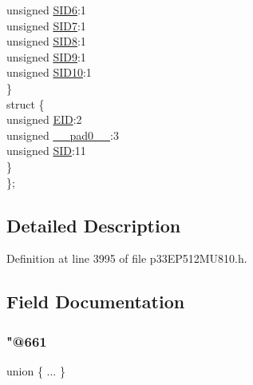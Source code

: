 \begin{DoxyCompactItemize}
\begin{tabbing}
\>\>unsigned \hyperlink{structtag_c1_r_x_f5_s_i_d_b_i_t_s_a70d70952133eb2389d5c326f9f0e8035}{SID6}:1\\
\>\>unsigned \hyperlink{structtag_c1_r_x_f5_s_i_d_b_i_t_s_a34097fb76decd431701fa2d86a22328e}{SID7}:1\\
\>\>unsigned \hyperlink{structtag_c1_r_x_f5_s_i_d_b_i_t_s_afe74894633244fdb0b0c01b4e8c522e7}{SID8}:1\\
\>\>unsigned \hyperlink{structtag_c1_r_x_f5_s_i_d_b_i_t_s_a33587704948067005c2a6a3ccc503c99}{SID9}:1\\
\>\>unsigned \hyperlink{structtag_c1_r_x_f5_s_i_d_b_i_t_s_a1a9084031c7f5fb16007feeebf0d8216}{SID10}:1\\
\>\} \\
\>struct \{\\
\>\>unsigned \hyperlink{structtag_c1_r_x_f5_s_i_d_b_i_t_s_ae80b378c9141f7c03e0b4e55b5f4b54d}{EID}:2\\
\>\>unsigned \hyperlink{structtag_c1_r_x_f5_s_i_d_b_i_t_s_adf71f3d8410c1f1dbbc96680a92c49af}{\_\_pad0\_\_}:3\\
\>\>unsigned \hyperlink{structtag_c1_r_x_f5_s_i_d_b_i_t_s_af88edf93b2fee2432665bd84f51287e4}{SID}:11\\
\>\} \\
\}; \\

\end{tabbing}\end{DoxyCompactItemize}


\subsection{Detailed Description}


Definition at line 3995 of file p33\+E\+P512\+M\+U810.\+h.



\subsection{Field Documentation}
\mbox{\label{structtag_c1_r_x_f5_s_i_d_b_i_t_s_a9eda17f78216c0b913bc8c87431cb640}} 
\subsubsection{\texorpdfstring{"@661}{@661}}
{\footnotesize\ttfamily union \{ ... \} }

\mbox{\label{structtag_c1_r_x_f5_s_i_d_b_i_t_s_adf71f3d8410c1f1dbbc96680a92c49af}} 
